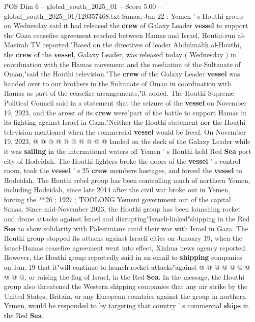 \begin{textsample}{POS Dim 6 – global\_south\_2025\_01 – Score 5.00 – global\_south\_2025\_01/120357468.txt}  \label{ex:f6_pos_437}
Sanaa, Jan 22 : Yemen ' s Houthi group on Wednesday said it had released the \textbf{crew} of Galaxy Leader \textbf{vessel} to support the Gaza ceasefire agreement reached between Hamas and Israel, Houthi-run al-Masirah TV reported."Based on the directives of leader Abdulmalik al-Houthi, the \textbf{crew} of the \textbf{vessel}, Galaxy Leader, was released today ( Wednesday ) in coordination with the Hamas movement and the mediation of the Sultanate of Oman,"said the Houthi television."The \textbf{crew} of the Galaxy Leader \textbf{vessel} was handed over to our brothers in the Sultanate of Oman in coordination with Hamas as part of the ceasefire arrangements,"it added.
The Houthi Supreme Political Council said in a statement that the seizure of the \textbf{vessel} on November 19, 2023, and the arrest of its \textbf{crew} were"part of the battle to support Hamas in its fighting against Israel in Gaza."Neither the Houthi statement nor the Houthi television mentioned when the commercial \textbf{vessel} would be freed.
On November 19, 2023, @ @ @ @ @ @ @ @ @ @ landed on the deck of the Galaxy Leader while it was \textbf{sailing} in the international waters off Yemen ' s Houthi-held Red \textbf{Sea} port city of Hodeidah.
The Houthi fighters broke the doors of the \textbf{vessel} ' s control room, took the \textbf{vessel} ' s 25 \textbf{crew} members hostages, and forced the \textbf{vessel} to Hodeidah.
The Houthi rebel group has been controlling much of northern Yemen, including Hodeidah, since late 2014 after the civil war broke out in Yemen, forcing the **26 ; 1927 ; TOOLONG Yemeni government out of the capital Sanaa.
Since mid-November 2023, the Houthi group has been launching rocket and drone attacks against Israel and disrupting"Israeli-linked"shipping in the Red \textbf{Sea} to show solidarity with Palestinians amid their war with Israel in Gaza.
The Houthi group stopped its attacks against Israeli cities on January 19, when the Israel-Hamas ceasefire agreement went into effect, Xinhua news agency reported.
However, the Houthi group reportedly said in an email to \textbf{shipping} companies on Jan. 19 that it"will continue to launch rocket attacks"against @ @ @ @ @ @ @ @ @ @, or raising the flag of Israel, in the Red \textbf{Sea}.
In the message, the Houthi group also threatened the Western shipping companies that any air strike by the United States, Britain, or any European countries against the group in northern Yemen, would be responded to by targeting that country ' s commercial \textbf{ships} in the Red \textbf{Sea}.

\end{textsample}
